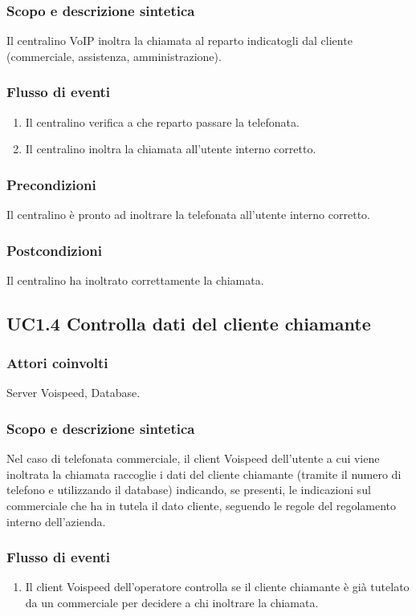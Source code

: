 \subsubsection*{Scopo e descrizione sintetica}
Il centralino VoIP  inoltra la chiamata al reparto indicatogli dal cliente (commerciale, assistenza, amministrazione).
\subsubsection*{Flusso di eventi}
\begin{enumerate}
\item Il centralino verifica a che reparto passare la telefonata.
\item Il centralino inoltra la chiamata all'utente interno corretto.
\end{enumerate}
\subsubsection*{Precondizioni} Il centralino \` e pronto ad inoltrare la telefonata all'utente interno corretto.
\subsubsection*{Postcondizioni} Il centralino ha inoltrato correttamente la chiamata.

\subsection*{UC1.4 Controlla dati del cliente chiamante}
\subsubsection*{Attori coinvolti} Server Voispeed, Database.
\subsubsection*{Scopo e descrizione sintetica}
Nel caso di telefonata commerciale, il client Voispeed dell'utente a cui viene inoltrata la chiamata raccoglie i dati del cliente chiamante (tramite il numero di telefono e utilizzando il database) indicando, se presenti, le indicazioni sul commerciale che ha in tutela il dato cliente, seguendo le regole del regolamento interno dell'azienda.
\subsubsection*{Flusso di eventi}
\begin{enumerate}
\item Il client Voispeed dell'operatore controlla se il cliente chiamante \` e gi\` a tutelato da un commerciale per decidere a chi inoltrare la chiamata.
\end{enumerate}
